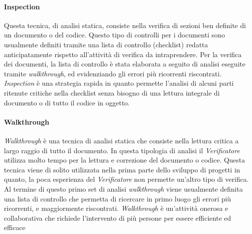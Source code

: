 \paragraph{Inspection}
Questa tecnica, di analisi statica, consiste nella verifica di sezioni ben definite di un documento o del codice. Questo tipo di controlli per i documenti sono usualmente definiti tramite una lista di controllo (checklist) redatta anticipatamente rispetto all'attività di verifica da intraprendere. Per la verifica dei documenti, la lista di controllo è stata elaborata a seguito di analisi eseguite tramite \textit{walkthrough}, ed evidenziando gli errori più ricorrenti riscontrati. \textit{Inspection} è una strategia rapida in quanto permette l'analisi di alcuni parti ritenute critiche nella checklist senza bisogno di una lettura integrale di documento o di tutto il codice in oggetto.
\paragraph{Walkthrough}
\textit{Walkthrough} è una tecnica di analisi statica che consiste nella lettura critica a largo raggio di tutto il documento. In questa tipologia di analisi il \textit{Verificatore} utilizza molto tempo per la lettura e correzione del documento o codice. Questa tecnica viene di solito utilizzata nella prima parte dello sviluppo di progetti in quanto, la poca esperienza del \textit{Verificatore} non permette un'altro tipo di verifica. Al termine di questo primo set di analisi \textit{walkthrough} viene usualmente definita una lista di controllo che permetta di ricercare in primo luogo gli errori più ricorrenti, e maggiormente riscontrati. \textit{Walkthrough} è un'attività onerosa e collaborativa che richiede l'intervento di più persone per essere efficiente ed efficace
